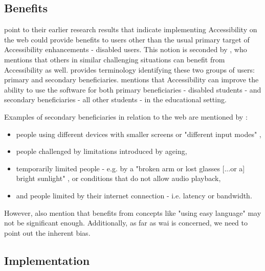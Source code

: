 \subsection{Benefits}

\textcite{Juergen_et_all_2020} point to their earlier research results that indicate implementing Accessibility on the web could provide benefits to users other than the usual primary target of Accessibility enhancements - disabled users.
This notion is seconded by \textcite{Vanderheiden_2000}, who mentions that others in similar challenging situations can benefit from Accessibility as well.
\textcite{Edyburn_2010} provides terminology identifying these two groups of users: primary and secondary beneficiaries. \textcite{Edyburn_2021} mentions that Accessibility can improve the ability to use the software for both primary beneficiaries - disabled students - and secondary beneficiaries - all other students - in the educational setting.

Examples of secondary beneficiaries in relation to the web are mentioned by \textcite{WAI_Intro}:

\begin{itemize}
    \item people using different devices with smaller screens or "different input modes" \parencite{WAI_Intro},
    \item people challenged by limitations introduced by ageing,
    \item temporarily limited people - e.g. by a "broken arm or lost glasses [...or a] bright sunlight" \parencite{WAI_Intro}, or conditions that do not allow audio playback,
    \item and people limited by their internet connection - i.e. latency or bandwidth.
\end{itemize}

However, \textcite{Juergen_et_all_2020} also mention that benefits from concepts like "using easy language" \parencite[p. 1210]{Juergen_et_all_2020} may not be significant enough.
Additionally, as far as \gls{wai} is concerned, we need to point out the inherent bias.

\subsection{Implementation}

